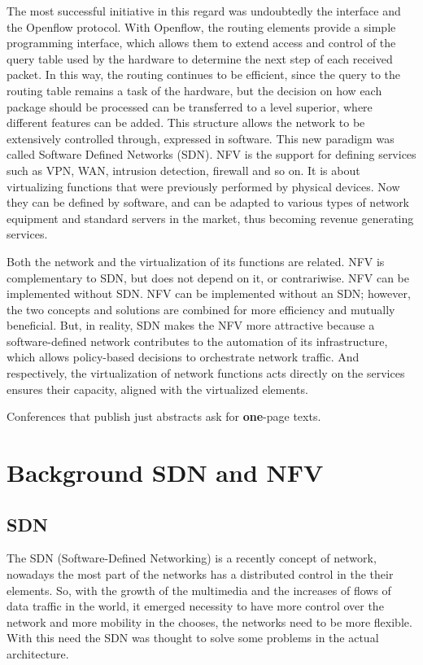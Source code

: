 \documentclass[12pt]{article}
\begin{document}
The most successful initiative in this regard was undoubtedly the interface and the Openflow protocol. With Openflow, the routing elements provide a simple programming interface, which allows them to extend access and control of the query table used by the hardware to determine the next step of each received packet. In this way, the routing continues to be efficient, since the query to the routing table remains a task of the hardware, but the decision on how each package should be processed can be transferred to a level superior, where different features can be added. This structure allows the network to be extensively controlled through, expressed in software. This new paradigm was called Software Defined Networks (SDN). NFV is the support for defining services such as VPN, WAN, intrusion detection, firewall and so on. It is about virtualizing functions that were previously performed by physical devices. Now they can be defined by software, and can be adapted to various types of network equipment and standard servers in the market, thus becoming revenue generating services.

Both the network and the virtualization of its functions are related. NFV is complementary to SDN, but does not depend on it, or contrariwise. NFV can be implemented without SDN. NFV can be implemented without an SDN; however, the two concepts and solutions are combined for more efficiency and mutually beneficial. But, in reality, SDN makes the NFV more attractive because a software-defined network contributes to the automation of its infrastructure, which allows policy-based decisions to orchestrate network traffic. And respectively, the virtualization of network functions acts directly on the services ensures their capacity, aligned with the virtualized elements.

Conferences that publish just abstracts ask for \textbf{one}-page texts.

\section{Background SDN and NFV} \label{sec:sdn}
\subsection{SDN}

The SDN (Software-Defined Networking) is a recently concept of network, nowadays the most part of the networks has a distributed control in the their elements. So, with the growth of the multimedia and the increases of flows of data traffic in the world, it emerged necessity to have more control over the network and more mobility in the chooses, the networks need to be more flexible. With this need the SDN was thought to solve some problems in the actual architecture.
\end{document}
